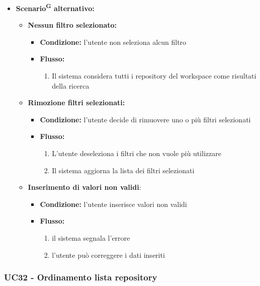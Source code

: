 \documentclass[a4paper, 11pt]{article}
\begin{document}
\begin{itemize}
	\item \textbf{Scenario\textsuperscript{G} alternativo:}
	\begin{itemize}
		\item \textbf{Nessun filtro selezionato:} 
			\begin{itemize}
				\item \textbf{Condizione:} l'utente non seleziona alcun filtro
				\item \textbf{Flusso:} 
				\begin{enumerate}
					\item Il sistema considera tutti i repository del workspace come risultati della ricerca
				\end{enumerate}
			\end{itemize}
		\item \textbf{Rimozione filtri selezionati:} 
			\begin{itemize}
				\item \textbf{Condizione:} l'utente decide di rimuovere uno o più filtri selezionati
				\item \textbf{Flusso:} 
				\begin{enumerate}
					\item L'utente deseleziona i filtri che non vuole più utilizzare
					\item Il sistema aggiorna la lista dei filtri selezionati
				\end{enumerate}
			\end{itemize}
		\item \textbf{Inserimento di valori non validi}:
		\begin{itemize}
				\item \textbf{Condizione:} l'utente inserisce valori non validi
				\item \textbf{Flusso:} 
				\begin{enumerate}
					\item il sistema segnala l'errore
					\item l'utente può correggere i dati inseriti
				\end{enumerate}
		\end{itemize}
	\end{itemize}
\end{itemize}

\subsubsection{UC32 - Ordinamento lista repository}\label{UC32}
\end{document}

